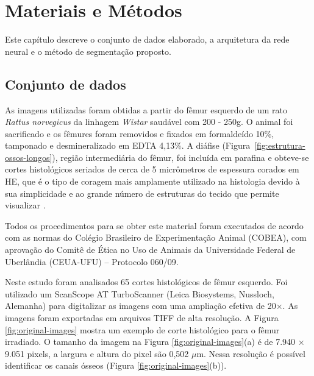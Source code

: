 \chapter[Materiais e Métodos]{Materiais e Métodos}
\label{materiais-e-metodos}

Este capítulo descreve o conjunto de dados elaborado, a arquitetura da rede neural e o método de segmentação proposto.

\section{Conjunto de dados}

As imagens utilizadas foram obtidas a partir do fêmur esquerdo de um rato \textit{Rattus norvegicus} da linhagem \textit{Wistar} saudável com 200 - 250g. O animal foi sacrificado e os fêmures foram removidos e fixados em formaldeído 10\%, tamponado e desmineralizado em EDTA 4,13\%. A diáfise (Figura~\ref{fig:estrutura-ossos-longos}), região intermediária do fêmur, foi incluída em parafina e obteve-se cortes histológicos seriados de cerca de 5 micrômetros de espessura corados em \ac{HE}, que é o tipo de coragem mais amplamente utilizado na histologia devido à sua simplicidade e ao grande número de estruturas do tecido que permite visualizar \cite{feldman2014tissue}. 

Todos os procedimentos para se obter este material foram executados de acordo com as normas do Colégio Brasileiro de Experimentação Animal (COBEA), com aprovação do Comitê de Ética no Uso de Animais da Universidade Federal de Uberlândia (CEUA-UFU) -- Protocolo 060/09.

Neste estudo foram analisados 65 cortes histológicos de fêmur esquerdo. Foi utilizado um ScanScope AT Turbo\textregistered Scanner (Leica Biosystems, Nussloch, Alemanha) para digitalizar as imagens com uma ampliação efetiva de 20×. As imagens foram exportadas em arquivos TIFF de alta resolução. A Figura \ref{fig:original-images} mostra um exemplo de corte histológico para o fêmur irradiado. O tamanho da imagem na Figura \ref{fig:original-images}(a) é de 7.940 × 9.051 pixels, a largura e altura do pixel são 0,502 \(\mu\)m. Nessa resolução é possível identificar os canais ósseos (Figura \ref{fig:original-images}(b)).

